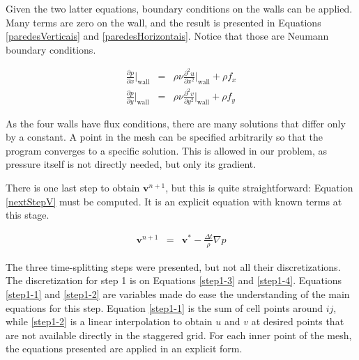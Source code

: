 \documentclass[journal]{IEEEtran}
\begin{document}
Given the two latter equations, boundary conditions on the walls can be applied. Many terms are zero on the wall, and the result is presented in Equations \ref{paredesVerticais} and \ref{paredesHorizontais}. Notice that those are Neumann boundary conditions.

\begin{eqnarray}
\frac{\partial p}{\partial x}\Bigg|_{\textrm{wall}}&=&\rho\nu\frac{\partial^2
u}{\partial x^2}\Bigg|_{\textrm{wall}}+\rho f_x\label{paredesVerticais}\\
\frac{\partial p}{\partial y}\Bigg|_{\textrm{wall}}&=&\rho\nu\frac{\partial^2
v}{\partial y^2}\Bigg|_{\textrm{wall}}+\rho f_y\label{paredesHorizontais}
\end{eqnarray}

As the four walls have flux conditions, there are many solutions that differ only by a constant. A point in the mesh can be specified arbitrarily so that the program converges to a specific solution. This is allowed in our problem, as pressure itself is not directly needed, but only its gradient.

There is one last step to obtain $\mathbf{v}^{n+1}$, but this is quite straightforward: Equation \ref{nextStepV} must be computed. It is an explicit equation with known terms at this stage.

\begin{eqnarray}
	\mathbf{v}^{n+1} & = & \mathbf{v}^*  - \frac{\Delta t}{\rho} \nabla p \label{nextStepV}
\end{eqnarray}

The three time-splitting steps were presented, but not all their discretizations. The discretization for step 1 is on Equations \ref{step1-3} and \ref{step1-4}. Equations \ref{step1-1} and \ref{step1-2} are variables made do ease the understanding of the main equations for this step. Equation \ref{step1-1} is the sum of cell points around $ij$, while \ref{step1-2} is a linear interpolation to obtain $u$ and $v$ at desired points that are not available directly in the staggered grid.  For each inner point of the mesh, the equations presented are applied in an explicit form.
\end{document}

